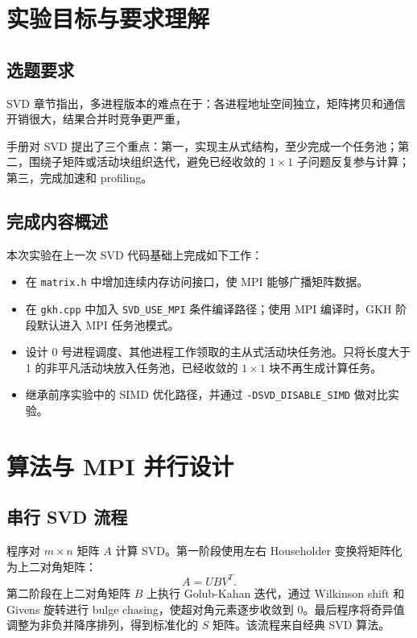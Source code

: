 \documentclass[UTF8,a4paper,10pt,fontset=windows]{ctexart}
\begin{document}
\tableofcontents
\newpage
\setcounter{page}{1}

\section{实验目标与要求理解}

\subsection{选题要求}
SVD 章节指出，多进程版本的难点在于：各进程地址空间独立，矩阵拷贝和通信开销很大，结果合并时竞争更严重，

手册对 SVD 提出了三个重点：第一，实现主从式结构，至少完成一个任务池；第二，围绕子矩阵或活动块组织迭代，避免已经收敛的 $1\times1$ 子问题反复参与计算；第三，完成加速和 profiling。

\subsection{完成内容概述}
本次实验在上一次 SVD 代码基础上完成如下工作：

\begin{itemize}
  \item 在 \texttt{matrix.h} 中增加连续内存访问接口，使 MPI 能够广播矩阵数据。
  \item 在 \texttt{gkh.cpp} 中加入 \texttt{SVD\_USE\_MPI} 条件编译路径；使用 MPI 编译时，GKH 阶段默认进入 MPI 任务池模式。
  \item 设计 0 号进程调度、其他进程工作领取的主从式活动块任务池。只将长度大于 1 的非平凡活动块放入任务池，已经收敛的 $1\times1$ 块不再生成计算任务。
  \item 继承前序实验中的 SIMD 优化路径，并通过 \texttt{-DSVD\_DISABLE\_SIMD} 做对比实验。
\end{itemize}


\section{算法与 MPI 并行设计}

\subsection{串行 SVD 流程}
程序对 $m\times n$ 矩阵 $A$ 计算 SVD。第一阶段使用左右 Householder 变换将矩阵化为上二对角矩阵：
\[
    A = U B V^T .
\]
第二阶段在上二对角矩阵 $B$ 上执行 Golub-Kahan 迭代，通过 Wilkinson shift 和 Givens 旋转进行 bulge chasing，使超对角元素逐步收敛到 0。最后程序将奇异值调整为非负并降序排列，得到标准化的 $S$ 矩阵。该流程来自经典 SVD 算法\cite{golub1965calculating,golub1970singular}。
\end{document}
